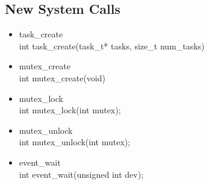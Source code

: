 \documentclass{article}
\begin{document}
\subsection{New System Calls}
\begin{itemize}
\item{task\_create}\\
	int task\_create(task\_t* tasks, size\_t num\_tasks)\\
	\newline
	{}

\item{mutex\_create}\\
	int mutex\_create(void)\\
	\newline
	{}

\item{mutex\_lock}\\
	int mutex\_lock(int mutex);\\
	\newline
	{}

\item{mutex\_unlock}\\
	int mutex\_unlock(int mutex);\\
	\newline
	{}

\item{event\_wait}\\
	int event\_wait(unsigned int dev);\\
	\newline
	{}
\end{itemize}


	
 
\end{document}
